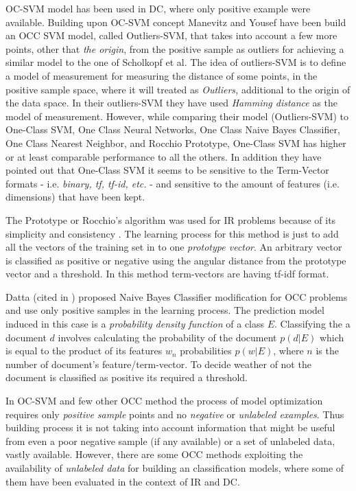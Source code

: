 OC-SVM model has been used in DC, where only positive example were available. Building upon OC-SVM concept Manevitz and Yousef \cite{manevitz2002one,khan2010survey}have been build an OCC SVM model, called Outliers-SVM, that takes into account a few more points, other that \textit{the origin}, from the positive sample as outliers for achieving a similar model to the one of Scholkopf et al. The idea of outliers-SVM is to define a model of measurement for measuring the distance of some points, in the positive sample space, where it will treated as \textit{Outliers,} additional to the origin of the data space. In their outliers-SVM they have used \textit{Hamming distance} as the model of measurement. However, while comparing their model (Outliers-SVM) to One-Class SVM, One Class Neural Networks, One Class Naive Bayes Classifier, One Class Nearest Neighbor, and Rocchio Prototype, One-Class SVM has higher or at least comparable performance to all the others. In addition they have pointed out that One-Class SVM it seems to be sensitive to the Term-Vector formats - i.e. \textit{binary, tf, tf-id, etc.} - and sensitive to the amount of features (i.e. dimensions) that have been kept.

The Prototype or Rocchio's algorithm was used for IR problems because of its simplicity and consistency \cite{joachims1997probabilistic}. The learning process for this method is just to add all the vectors of the training set in to one \textit{prototype vector}. An arbitrary vector is classified as positive or negative using the angular distance from the prototype vector and a threshold. In this method term-vectors are having tf-idf format. 

Datta (cited in \cite{manevitz2002one}) proposed Naive Bayes Classifier modification for OCC problems and use only positive samples in the learning process. The prediction model induced in this case is a \textit{probability density function} of a class $E$. Classifying the a document $d$ involves calculating the probability of the document $p(d|E)$ which is equal to the product of its features $w_{n}$ probabilities $p(w|E)$, where $n$ is the number of document's feature/term-vector. To decide weather of not the document is classified as positive its required
a threshold. 

In OC-SVM and few other OCC method the process of model optimization requires only \textit{positive sample} points and no \textit{negative} or \textit{unlabeled examples}. Thus building process it is not taking into account information that might be useful from even a poor negative sample (if any available) or a set of unlabeled data, vastly available. However, there are some OCC methods exploiting the availability of \textit{unlabeled data} for building an classification models, where some of them have been evaluated in the context of IR and DC. 

